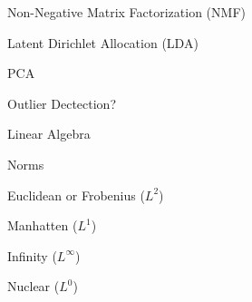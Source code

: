 \documentclass[11pt]{article}
\begin{document}
\begin{enumerate}
\begin{item}
\begin{enumerate}
\begin{item}
\begin{enumerate}
                \begin{item}
                  Non-Negative Matrix Factorization (NMF)
                \end{item}

                \begin{item}
                  Latent Dirichlet Allocation (LDA)
                \end{item}

                \begin{item}
                  PCA
                \end{item}

                \begin{item}
                  Outlier Dectection?
                \end{item}

            \end{enumerate}

          \end{item}

      \end{enumerate}

    \end{item}

    \begin{item}

      Linear Algebra

      \begin{enumerate}

          \begin{item}

            Norms

            \begin{enumerate}

                \begin{item}
                  Euclidean or Frobenius ($L^2$)
                \end{item}

                \begin{item}
                  Manhatten ($L^1$)
                \end{item}

                \begin{item}
                  Infinity ($L^{\infty}$)
                \end{item}

                \begin{item}
                  Nuclear ($L^0$)
                \end{item}


\end{enumerate}
\end{item}
\end{enumerate}
\end{item}
\end{enumerate}
\end{document}

